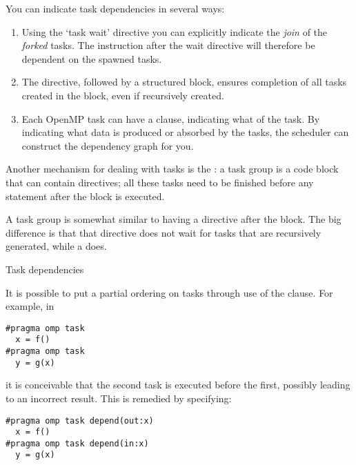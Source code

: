 You can indicate task dependencies in several ways:
\begin{enumerate}
\item Using the `task wait' directive you can explicitly indicate
  the \emph{join} of the
  \emph{forked} tasks. The instruction after the wait directive
  will therefore be dependent on the spawned tasks.
\item The  directive, followed
  by a structured block, ensures completion of all tasks
  created in the block, even if recursively created.
\item Each OpenMP task can have a 
  clause, indicating what  of the task.
  By indicating what data is produced or absorbed by the tasks,
  the scheduler can construct the dependency graph for you.
\end{enumerate}

Another mechanism for dealing with tasks is the
: a task group is a code block that can
contain  directives; all these tasks need to be
finished before any statement after the block is executed.

A task group is somewhat similar to having a 
directive after the block. The big difference is that that
 directive does not wait for tasks that are recursively
generated, while a  does.


 {Task dependencies}

It is possible to put a partial ordering on
tasks through use of the  clause. For example, in
\begin{verbatim}
#pragma omp task
  x = f()
#pragma omp task
  y = g(x)
\end{verbatim}
it is conceivable that the second task is executed before the first,
possibly leading to an incorrect result. This is remedied by specifying:
\begin{verbatim}
#pragma omp task depend(out:x)
  x = f()
#pragma omp task depend(in:x)
  y = g(x)
\end{verbatim}

